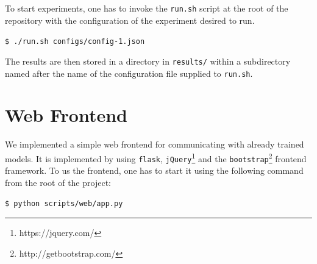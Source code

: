 To start experiments, one has to invoke the \texttt{run.sh} script at the root of the repository with the configuration of the experiment desired to run.

\texttt{\$ ./run.sh configs/config-1.json}

The results are then stored in a directory in \texttt{results/} within a subdirectory named after the name of the configuration file supplied to \texttt{run.sh}.

\section{Web Frontend}
\label{sofware_usage:web_frontend}
We implemented a simple web frontend for communicating with already trained models. It is implemented by using \texttt{flask}, \texttt{jQuery}\footnote{https://jquery.com/} and the \texttt{bootstrap}\footnote{http://getbootstrap.com/} frontend framework. To us the frontend, one has to start it using the following command from the root of the project:

\texttt{\$ python scripts/web/app.py}

